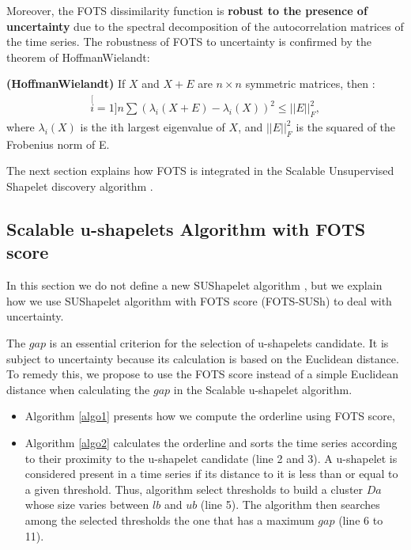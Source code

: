   Moreover, the FOTS dissimilarity function is \textbf{robust to the presence of
  uncertainty} due to the spectral decomposition of the autocorrelation matrices of the time series. The robustness of FOTS to  uncertainty is confirmed by the  theorem of HoffmanWielandt:   

\begin{theorem}
\textbf{(Hoffman\-Wielandt)} \cite{Bhatia1993} If $X$ and $X + E$ are $n \times
n$ symmetric matrices, then : 
\begin{eqnarray}
\stackrel[i=1]{n}{\sum}(\lambda_{i}(X+E)-\lambda_{i}(X))^{2}\leq||E||_{F}^{2},
\end{eqnarray}
where $\lambda_i(X)$ is the ith largest eigenvalue of $X$, and $||E||_{F}^{2}$
is the squared of the Frobenius norm of E.
\end{theorem}

The next section explains how FOTS is integrated in the Scalable Unsupervised Shapelet discovery algorithm \cite{ulanova2015scalable}.


\subsection{Scalable u-shapelets Algorithm with FOTS score}
In this section we do not define a new SUShapelet algorithm \cite{ulanova2015scalable}, but we explain how we use SUShapelet algorithm with FOTS score (FOTS-SUSh) to deal with uncertainty.



The $gap$ is an essential criterion for the selection of u-shapelets candidate. It is subject to uncertainty because its calculation is based on the
Euclidean distance. To remedy this, we propose to use the FOTS score instead of
a simple Euclidean distance when calculating the $gap$ in the Scalable u-shapelet algorithm.

\begin{itemize}
\item Algorithm  \ref{algo1} presents how we compute the orderline using FOTS score,
\item Algorithm \ref{algo2} calculates the orderline and sorts the time series according to their proximity to the u-shapelet candidate (line 2 and 3). A u-shapelet is considered present in a time series if its distance to it is less than or equal to a given threshold. Thus, algorithm select thresholds to build a cluster $Da$ whose size varies between $lb$ and $ub$ (line 5).  The algorithm then searches among the selected thresholds the one that has a maximum $gap$ (line 6 to 11).
\end{itemize}

